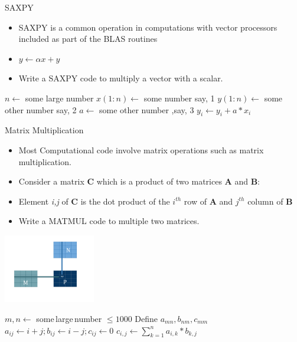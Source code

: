 \documentclass[c,mathserif,compress,xcolor=svgnames]{beamer}
\begin{document}
\begin{frame}{\small SAXPY}
  \begin{itemize}
    \item SAXPY is a common operation in computations with vector processors included as part of the BLAS routines
    \item[] $y\leftarrow \alpha x + y$
    \item Write a SAXPY code to multiply a vector with a scalar.
  \end{itemize}
  \begin{algorithm}[H]
    \caption{Pseudo Code for SAXPY}
    \begin{algorithmic}
      \State $n \gets$ some large number
      \State $x(1:n) \gets$ some number say, 1
      \State $y(1:n) \gets$ some other number say, 2
      \State $a \gets$ some other number ,say, 3
      \State $y_i \gets y_i + a * x_i$
      \EndDo
    \end{algorithmic}
  \end{algorithm}
\end{frame}

\begin{frame}[allowframebreaks]{Matrix Multiplication}
  \begin{itemize}
    \item Most Computational code involve matrix operations such as matrix multiplication.
    \item Consider a matrix {\bf C} which is a product of two matrices {\bf A} and {\bf B}:
    \item[] Element {\it i,j} of {\bf C} is the dot product of the $i^{th}$ row of {\bf A} and $j^{th}$ column of {\bf B}
    \item Write a MATMUL code to multiple two matrices.
  \end{itemize}
  \begin{center}
    \includegraphics[width=0.3\textwidth]{./matmul}
  \end{center}

  \begin{algorithm}[H]
    \caption{Pseudo Code for MATMUL}
    \begin{algorithmic}
      \State $m,n \gets$ some\,large\,number $\le 1000$
      \State Define $a_{mn}, b_{nm}, c_{mm}$
      \State $a_{ij} \gets i+j; b_{ij} \gets i-j; c_{ij} \gets 0$
      \State $c_{i,j} \gets \sum^{n}_{k=1} a_{i,k}*b_{k,j}$
      \EndDo
      \EndDo
    \end{algorithmic}
  \end{algorithm}
\end{frame}
\end{document}
